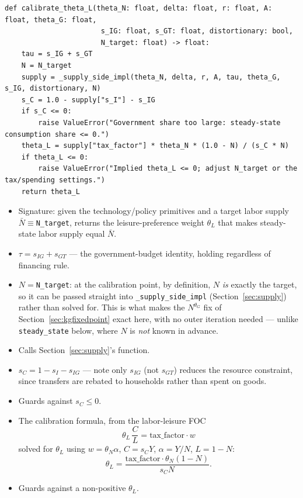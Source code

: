 \documentclass[11pt]{article}
\newcommand{\eq}[1]{\begin{equation}#1\end{equation}}
\begin{document}
\begin{lstlisting}[firstnumber=143]
def calibrate_theta_L(theta_N: float, delta: float, r: float, A: float, theta_G: float,
                       s_IG: float, s_GT: float, distortionary: bool,
                       N_target: float) -> float:
    tau = s_IG + s_GT
    N = N_target
    supply = _supply_side_impl(theta_N, delta, r, A, tau, theta_G, s_IG, distortionary, N)
    s_C = 1.0 - supply["s_I"] - s_IG
    if s_C <= 0:
        raise ValueError("Government share too large: steady-state consumption share <= 0.")
    theta_L = supply["tax_factor"] * theta_N * (1.0 - N) / (s_C * N)
    if theta_L <= 0:
        raise ValueError("Implied theta_L <= 0; adjust N_target or the tax/spending settings.")
    return theta_L
\end{lstlisting}
\label{sec:calib}
\begin{itemize}
\item[\textbf{L143--L145}] Signature: given the technology/policy primitives
and a target labor supply $\bar N\equiv$\texttt{N\_target}, returns the
leisure-preference weight $\theta_L$ that makes steady-state labor supply
equal $\bar N$.
\item[\textbf{L148}] $\tau=s_{IG}+s_{GT}$ --- the government-budget
identity, holding regardless of financing rule.
\item[\textbf{L149}] $N=$\texttt{N\_target}: at the calibration point, by
definition, $N$ \emph{is} exactly the target, so it can be passed straight
into \texttt{\_supply\_side\_impl} (Section~\ref{sec:supply}) rather than
solved for. This is what makes the $N^{\theta_G}$ fix of
Section~\ref{sec:kgfixedpoint} exact here, with no outer iteration needed
--- unlike \texttt{steady\_state} below, where $N$ is \emph{not} known in
advance.
\item[\textbf{L150}] Calls Section~\ref{sec:supply}'s function.
\item[\textbf{L151}] $s_C=1-s_I-s_{IG}$ --- note only $s_{IG}$ (not
$s_{GT}$) reduces the resource constraint, since transfers are rebated to
households rather than spent on goods.
\item[\textbf{L152--L153}] Guards against $s_C\le0$.
\item[\textbf{L154}] The calibration formula, from the labor-leisure FOC
\eq{ \theta_L\,\frac{C}{L} = \text{tax\_factor}\cdot w \label{eq:foc-labor} }
solved for $\theta_L$ using $w=\theta_N\alpha$, $C=s_C Y$, $\alpha=Y/N$,
$L=1-N$:
\eq{ \theta_L = \frac{\text{tax\_factor}\cdot\theta_N(1-N)}{s_C N}. }
\item[\textbf{L155--L156}] Guards against a non-positive $\theta_L$.
\end{itemize}
\end{document}
